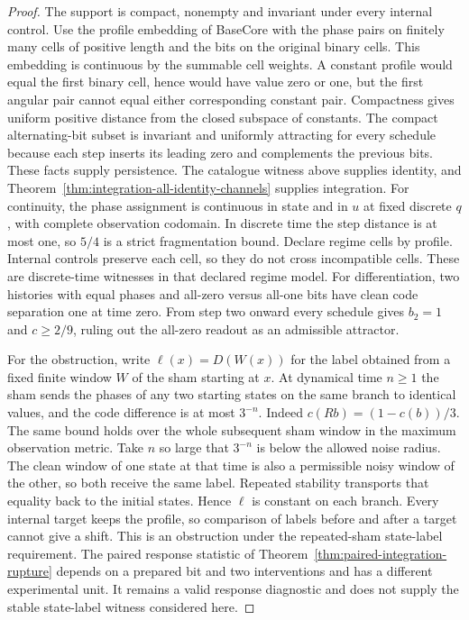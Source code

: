 \documentclass[11pt,a4paper]{article}
\theoremstyle{definition}
\begin{document}
\begin{proof}
The support is compact, nonempty and invariant under every internal control. Use the profile embedding of BaseCore with the phase pairs on finitely many cells of positive length and the bits on the original binary cells. This embedding is continuous by the summable cell weights. A constant profile would equal the first binary cell, hence would have value zero or one, but the first angular pair cannot equal either corresponding constant pair. Compactness gives uniform positive distance from the closed subspace of constants. The compact alternating-bit subset is invariant and uniformly attracting for every schedule because each step inserts its leading zero and complements the previous bits. These facts supply persistence. The catalogue witness above supplies identity, and Theorem~\ref{thm:integration-all-identity-channels} supplies integration. For continuity, the phase assignment is continuous in state and in $u$ at fixed discrete $q$, with complete observation codomain. In discrete time the step distance is at most one, so $5/4$ is a strict fragmentation bound. Declare regime cells by profile. Internal controls preserve each cell, so they do not cross incompatible cells. These are discrete-time witnesses in that declared regime model. For differentiation, two histories with equal phases and all-zero versus all-one bits have clean code separation one at time zero. From step two onward every schedule gives $b_2=1$ and $c\ge2/9$, ruling out the all-zero readout as an admissible attractor.

For the obstruction, write $\ell(x)=D(W(x))$ for the label obtained from a fixed finite window $W$ of the sham starting at $x$. At dynamical time $n\ge1$ the sham sends the phases of any two starting states on the same branch to identical values, and the code difference is at most $3^{-n}$. Indeed $c(Rb)=(1-c(b))/3$. The same bound holds over the whole subsequent sham window in the maximum observation metric. Take $n$ so large that $3^{-n}$ is below the allowed noise radius. The clean window of one state at that time is also a permissible noisy window of the other, so both receive the same label. Repeated stability transports that equality back to the initial states. Hence $\ell$ is constant on each branch. Every internal target keeps the profile, so comparison of labels before and after a target cannot give a shift. This is an obstruction under the repeated-sham state-label requirement. The paired response statistic of Theorem~\ref{thm:paired-integration-rupture} depends on a prepared bit and two interventions and has a different experimental unit. It remains a valid response diagnostic and does not supply the stable state-label witness considered here.
\end{proof}
\end{document}
